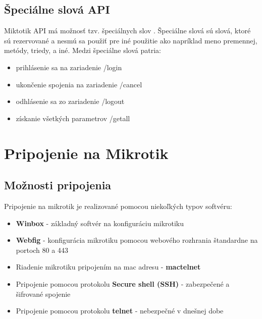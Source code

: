 \section{Špeciálne slová API}
Miktotik API má možnosť tzv. špeciálnych slov \cite{API}. Špeciálne slová sú slová, ktoré sú rezervované  a nesmú sa použiť pre iné použitie ako napríklad meno premennej, metódy, triedy, a iné. Medzi špeciálne slová patria:\begin{itemize}
\item prihlásenie sa na zariadenie \//login
\item ukončenie spojenia na zariadenie \//cancel
\item odhlásenie sa zo zariadenie \//logout
\item získanie všetkých parametrov \//getall
\end{itemize}   
\chapter{Pripojenie na Mikrotik}
\section{Možnosti pripojenia}
Pripojenie na mikrotik je realizované pomocou niekoľkých typov softvéru:\begin{itemize}
\item \textbf{Winbox} - základný softvér na konfiguráciu mikrotiku
\item \textbf{Webfig} - konfigurácia mikrotiku pomocou webového rozhrania štandardne na portoch 80 a 443
\item Riadenie mikrotiku pripojením na mac adresu - \textbf{mactelnet}
\item Pripojenie pomocou protokolu \textbf{Secure shell (SSH)} - zabezpečené a šifrované spojenie
\item Pripojenie pomocou protokolu \textbf{telnet} - nebezpečné v dnešnej dobe
\end{itemize}
